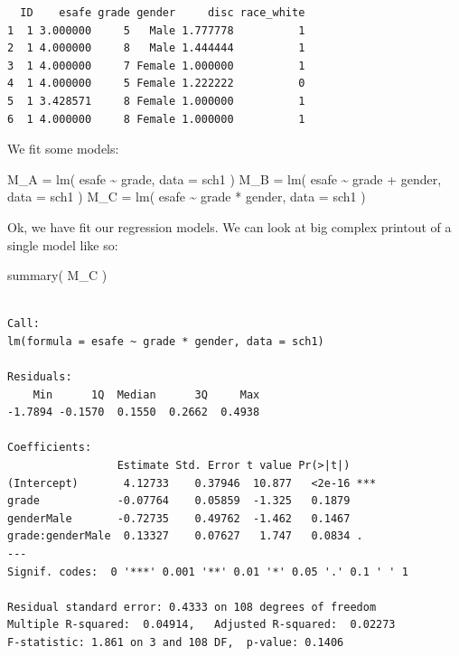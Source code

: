 \documentclass[
  letterpaper,
  DIV=11,
  numbers=noendperiod]{scrreprt}
\newenvironment{Shaded}{\begin{snugshade}}{\end{snugshade}}
\newcommand{\AttributeTok}[1]{\textcolor[rgb]{0.49,0.56,0.16}{#1}}
\newcommand{\FunctionTok}[1]{\textcolor[rgb]{0.02,0.16,0.49}{#1}}
\newcommand{\NormalTok}[1]{\textcolor[rgb]{0.00,0.44,0.13}{#1}}
\newcommand{\OtherTok}[1]{\textcolor[rgb]{0.00,0.44,0.13}{#1}}
\newcommand{\SpecialCharTok}[1]{\textcolor[rgb]{0.25,0.44,0.63}{#1}}
\begin{document}
\begin{verbatim}
  ID    esafe grade gender     disc race_white
1  1 3.000000     5   Male 1.777778          1
2  1 4.000000     8   Male 1.444444          1
3  1 4.000000     7 Female 1.000000          1
4  1 4.000000     5 Female 1.222222          0
5  1 3.428571     8 Female 1.000000          1
6  1 4.000000     8 Female 1.000000          1
\end{verbatim}

We fit some models:

\begin{Shaded}
\begin{Highlighting}[]
\NormalTok{M\_A }\OtherTok{=} \FunctionTok{lm}\NormalTok{( esafe }\SpecialCharTok{\textasciitilde{}}\NormalTok{ grade, }\AttributeTok{data =}\NormalTok{ sch1 )}
\NormalTok{M\_B }\OtherTok{=} \FunctionTok{lm}\NormalTok{( esafe }\SpecialCharTok{\textasciitilde{}}\NormalTok{ grade }\SpecialCharTok{+}\NormalTok{ gender, }\AttributeTok{data =}\NormalTok{ sch1 )}
\NormalTok{M\_C }\OtherTok{=} \FunctionTok{lm}\NormalTok{( esafe }\SpecialCharTok{\textasciitilde{}}\NormalTok{ grade }\SpecialCharTok{*}\NormalTok{ gender, }\AttributeTok{data =}\NormalTok{ sch1 )}
\end{Highlighting}
\end{Shaded}

Ok, we have fit our regression models. We can look at big complex
printout of a single model like so:

\begin{Shaded}
\begin{Highlighting}[]
\FunctionTok{summary}\NormalTok{( M\_C )}
\end{Highlighting}
\end{Shaded}

\begin{verbatim}

Call:
lm(formula = esafe ~ grade * gender, data = sch1)

Residuals:
    Min      1Q  Median      3Q     Max 
-1.7894 -0.1570  0.1550  0.2662  0.4938 

Coefficients:
                 Estimate Std. Error t value Pr(>|t|)    
(Intercept)       4.12733    0.37946  10.877   <2e-16 ***
grade            -0.07764    0.05859  -1.325   0.1879    
genderMale       -0.72735    0.49762  -1.462   0.1467    
grade:genderMale  0.13327    0.07627   1.747   0.0834 .  
---
Signif. codes:  0 '***' 0.001 '**' 0.01 '*' 0.05 '.' 0.1 ' ' 1

Residual standard error: 0.4333 on 108 degrees of freedom
Multiple R-squared:  0.04914,   Adjusted R-squared:  0.02273 
F-statistic: 1.861 on 3 and 108 DF,  p-value: 0.1406
\end{verbatim}
\end{document}
